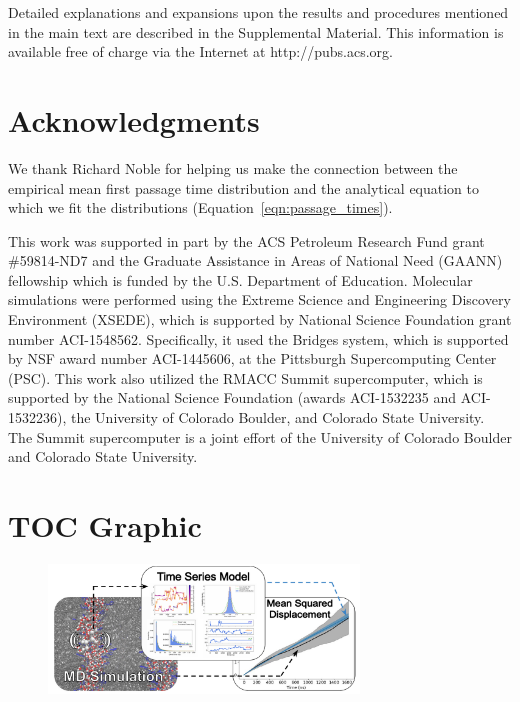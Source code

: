 \documentclass[aps,pre,preprint,groupedaddress,longbibliography]{revtex4-2}
\begin{document}
  Detailed explanations and expansions upon the results and procedures mentioned in
  the main text are described in the Supplemental Material. This information is
  available free of charge via the Internet at http://pubs.acs.org.

  \section*{Acknowledgments}
  
  We thank Richard Noble for helping us make the connection between the empirical 
  mean first passage time distribution and the analytical equation to which we fit
  the distributions (Equation~\ref{eqn:passage_times}).
  
  This work was supported in part by the ACS Petroleum Research Fund grant \#59814-ND7
  and the Graduate Assistance in Areas of National Need (GAANN)
  fellowship which is funded by the U.S. Department of Education.
  Molecular simulations were performed using the Extreme Science and
  Engineering Discovery Environment (XSEDE), which is supported by National
  Science Foundation grant number ACI-1548562. Specifically, it used the Bridges
  system, which is supported by NSF award number ACI-1445606, at the Pittsburgh
  Supercomputing Center (PSC). This work also utilized the RMACC Summit supercomputer,
  which is supported by the National Science Foundation (awards ACI-1532235 and
  ACI-1532236), the University of Colorado Boulder, and Colorado State
  University. The Summit supercomputer is a joint effort of the University of
  Colorado Boulder and Colorado State University.

  

  \section*{TOC Graphic}
    
  \begin{figure}[!htb]
  \centering
  \includegraphics[width=3.25in]{toc.pdf}
  \end{figure}
\end{document}
